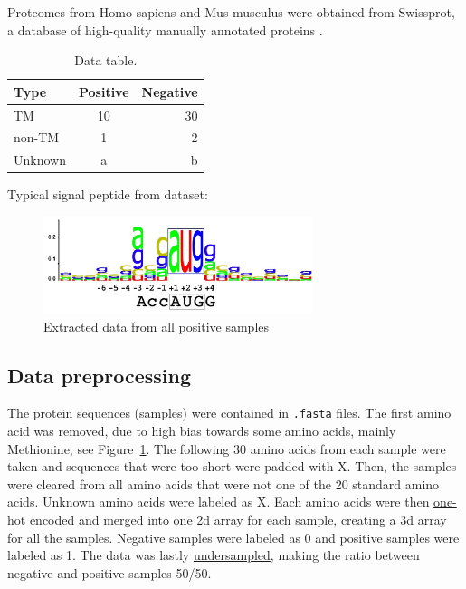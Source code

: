 Proteomes from Homo sapiens and Mus musculus were obtained from Swissprot, a database of high-quality manually annotated proteins \cite{swissprot}.

\begin{table}[H]
\centering
\begin{tabular}{l | c | r} %
Type & Positive & Negative \\\hline
TM & 10 & 30 \\
non-TM & 1 & 2 \\
Unknown & a & b
\end{tabular}
\caption{\label{tab:datatable}Data table.}
\end{table}

Typical signal peptide from dataset:
\begin{figure}[H]
\centering
\includegraphics[width=0.7\textwidth]{pictures/seqlogo.png}
\caption{\label{fig:seqlogo}Extracted data from all positive samples}
\end{figure}

\subsection{Data preprocessing}

The protein sequences (samples) were contained in \verb|.fasta| files.
The first amino acid was removed, due to high bias towards some amino acids, mainly Methionine, see Figure~\ref{fig:seqlogo}.
The following 30 amino acids from each sample were taken and sequences that were too short were padded with X.
Then, the samples were cleared from all amino acids that were not one of the 20 standard amino acids. Unknown amino acids were labeled as X.
Each amino acids were then \href{https://en.wikipedia.org/wiki/One-hot}{one-hot encoded} and merged into one 2d array for each sample, creating a 3d array for all the samples.
Negative samples were labeled as 0 and positive samples were labeled as 1.
The data was lastly \href{https://en.wikipedia.org/wiki/Oversampling_and_undersampling_in_data_analysis}{undersampled}, making the ratio between negative and positive samples 50/50.

